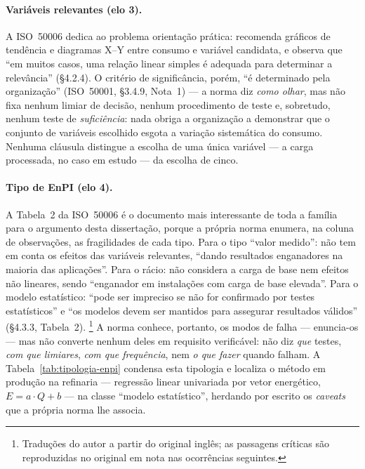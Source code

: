 \paragraph{Variáveis relevantes (elo 3).} A ISO~50006 dedica ao problema orientação prática: recomenda gráficos de tendência e diagramas X--Y entre consumo e variável candidata, e observa que \enquote{em muitos casos, uma relação linear simples é adequada para determinar a relevância} (\S4.2.4). O critério de significância, porém, \enquote{é determinado pela organização} (ISO~50001, \S3.4.9, Nota~1) --- a norma diz \emph{como olhar}, mas não fixa nenhum limiar de decisão, nenhum procedimento de teste e, sobretudo, nenhum teste de \emph{suficiência}: nada obriga a organização a demonstrar que o conjunto de variáveis escolhido esgota a variação sistemática do consumo. Nenhuma cláusula distingue a escolha de uma única variável --- a carga processada, no caso em estudo --- da escolha de cinco.

\paragraph{Tipo de EnPI (elo 4).} A Tabela~2 da ISO~50006 é o documento mais interessante de toda a família para o argumento desta dissertação, porque a própria norma enumera, na coluna de observações, as fragilidades de cada tipo. Para o tipo \enquote{valor medido}: não tem em conta os efeitos das variáveis relevantes, \enquote{dando resultados enganadores na maioria das aplicações}. Para o rácio: não considera a carga de base nem efeitos não lineares, sendo \enquote{enganador em instalações com carga de base elevada}. Para o modelo estatístico: \enquote{pode ser impreciso se não for confirmado por testes estatísticos} e \enquote{os modelos devem ser mantidos para assegurar resultados válidos} (\S4.3.3, Tabela~2). \footnote{Traduções do autor a partir do original inglês; as passagens críticas são reproduzidas no original em nota nas ocorrências seguintes.} A norma conhece, portanto, os modos de falha --- enuncia-os --- mas não converte nenhum deles em requisito verificável: não diz \emph{que} testes, \emph{com que limiares}, \emph{com que frequência}, nem \emph{o que fazer} quando falham. A Tabela~\ref{tab:tipologia-enpi} condensa esta tipologia e localiza o método em produção na refinaria --- regressão linear univariada por vetor energético, $E = a \cdot Q + b$ --- na classe \enquote{modelo estatístico}, herdando por escrito os \emph{caveats} que a própria norma lhe associa.

